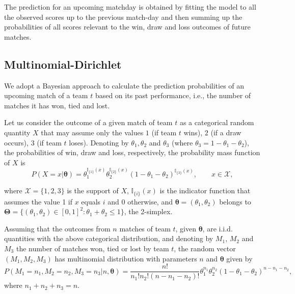 \documentclass[journal,article,accept,moreauthors,pdftex,12pt,a4paper]{mdpi}
\begin{document}
The prediction for an upcoming matchday is obtained by fitting the
model to all the observed scores up to the previous match-day and
then summing up the probabilities of all scores relevant to the win,
draw and loss outcomes of future matches.

    \subsection{Multinomial-Dirichlet}
    \label{sec::Mn_Dir}

        We adopt a Bayesian approach to calculate the prediction probabilities of an upcoming match of a team $t$ based on its past performance, i.e., the number of matches it has won, tied and lost.

        Let us consider the outcome of a given match of team $t$ as a categorical random quantity $X$ that may assume only the values $1$ (if team $t$ wins), $2$ (if a draw occurs), $3$ (if team $t$ loses).
        Denoting by $\theta_1, \theta_2$ and $\theta_3$ (where $\theta_3 = 1-\theta_1 - \theta_2$), the probabilities of win, draw and loss, respectively, the probability mass function of $X$ is
        \[
        P(X=x | \boldsymbol{\theta}) = \theta_1^{\mathbb{I}_{\{1\}}(x)}
        \theta_2^{\mathbb{I}_{\{2\}}(x)}(1 - \theta_1 -
        \theta_2)^{{\mathbb{I}_{\{3\}}}(x)}, \qquad x \in \mathcal{X},
        \]

        \noindent
        where $\mathcal{X}=\{1,2,3\}$ is the support of $X$,
        $\mathbb{I}_{\{i\}}(x)$ is the indicator function that assumes the
        value 1 if $x$ equals $i$ and 0 otherwise, and $\boldsymbol{\theta}
        = (\theta_1, \theta_2)$ belongs to $\boldsymbol{\Theta} =
        \{(\theta_1,\theta_2)\in [0,1]^2: \theta_1+\theta_2 \leq 1 \}$, the 2-simplex.

        Assuming that the outcomes from $n$ matches of team $t$, given $\boldsymbol{\theta}$, are i.i.d. quantities with the above categorical distribution, and denoting by $M_1$, $M_2$ and $M_3$ the number of matches won, tied or lost by team $t$, the random vector $(M_1, M_2, M_3)$ has multinomial distribution with parameters $n$ and $\boldsymbol{\theta}$ given by
        \[
        P(M_1=n_1,M_2=n_2,M_3=n_3| n, \boldsymbol{\theta})=
        \frac{n!}{n_1!n_2!(n-n_1-n_2)!}\theta_1^{n_1}\theta_2^{n_2}(1-\theta_1-\theta_2)^{n-n_1-n_2},
        \]
        \noindent
        where $n_1 + n_2 + n_3 = n$.
\end{document}

